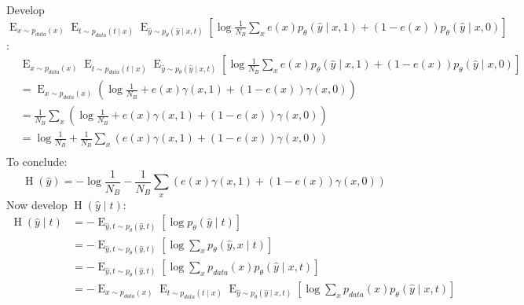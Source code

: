 \documentclass[oneside,12pt]{article}
\begin{document}
%
\\\\Develop $\operatorname{E}_{x \sim p_{data}(x)}
        \operatorname{E}_{t \sim p_{data}(t \mid x)}
        \operatorname{E}_{\hat{y} \sim p_\theta(\hat{y} \mid x,t)}
        \left[\operatorname{log}\frac{1}{N_B}\sum_x e(x)p_\theta(\hat{y} \mid x,1) + (1-e(x))p_\theta(\hat{y} \mid x,0)\right]$:
%
\begin{equation}
    \begin{split}
        &\operatorname{E}_{x \sim p_{data}(x)}
        \operatorname{E}_{t \sim p_{data}(t \mid x)}
        \operatorname{E}_{\hat{y} \sim p_\theta(\hat{y} \mid x,t)}
        \left[\operatorname{log}\frac{1}{N_B}\sum_x e(x)p_\theta(\hat{y} \mid x,1) + (1-e(x))p_\theta(\hat{y} \mid x,0)\right]\\
        &= \operatorname{E}_{x \sim p_{data}(x)}\left(\operatorname{log}\frac{1}{N_B} + e(x)\gamma(x,1) + (1-e(x))\gamma(x,0)\right)\\
        &= \frac{1}{N_B}\sum_x \left(\operatorname{log}\frac{1}{N_B} + e(x)\gamma(x,1) + (1-e(x))\gamma(x,0)\right)\\
        &= \operatorname{log}\frac{1}{N_B} + \frac{1}{N_B} \sum_x \left(e(x)\gamma(x,1) + (1-e(x))\gamma(x,0)\right)\\
    \end{split}
\end{equation}
%
To conclude:
\begin{equation}
   \operatorname{H}(\hat{y}) = - \operatorname{log}\frac{1}{N_B} - \frac{1}{N_B} \sum_x \left(e(x)\gamma(x,1) + (1-e(x))\gamma(x,0)\right)
\end{equation}
%
Now develop $\operatorname{H}(\hat{y} \mid t)$:
\begin{equation}
    \begin{split}
        \operatorname{H}(\hat{y} \mid t) &= -\operatorname{E}_{\hat{y},t \sim p_\theta(\hat{y},t)}\left[\operatorname{log}p_\theta(\hat{y} \mid t)\right]\\
        &= -\operatorname{E}_{\hat{y},t \sim p_\theta(\hat{y},t)}\left[\operatorname{log} \sum_x p_\theta(\hat{y},x \mid t)\right]\\
        &= -\operatorname{E}_{\hat{y},t \sim p_\theta(\hat{y},t)}\left[\operatorname{log} \sum_x p_{data}(x) p_\theta(\hat{y} \mid x,t)\right]\\
        &= -\operatorname{E}_{x \sim p_{data}(x)}
        \operatorname{E}_{t \sim p_{data}(t \mid x)}
        \operatorname{E}_{\hat{y} \sim p_\theta(\hat{y} \mid x,t)}
        \left[\operatorname{log} \sum_x p_{data}(x) p_\theta(\hat{y} \mid x,t)\right]\\
    \end{split}
\end{equation}
\end{document}

